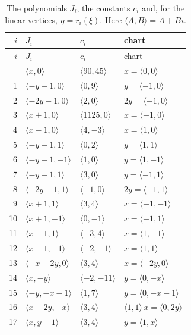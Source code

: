 \documentclass[11pt]{article}
\begin{document}
\begingroup\small
\setlength{\LTcapwidth}{\textwidth}
\begin{longtable}{@{}rlll@{}}
\caption{The polynomials $J_i$, the constants $c_i$ and, for the linear vertices, $\eta=r_i(\xi)$. Here $\langle A,B\rangle=A+Bi$.}\label{tab:cvert1}\\
\hline $i$ & $J_i$ & $c_i$ & chart\\\hline\endfirsthead\hline $i$ & $J_i$ & $c_i$ & chart\\\hline\endhead\hline\endfoot
0 & $\langle x,0\rangle$ & $\langle 90,45\rangle$ & $x=\langle 0,0\rangle$\\
1 & $\langle -y-1,0\rangle$ & $\langle 0,9\rangle$ & $y=\langle -1,0\rangle$\\
2 & $\langle -2y-1,0\rangle$ & $\langle 2,0\rangle$ & $2y=\langle -1,0\rangle$\\
3 & $\langle x+1,0\rangle$ & $\langle 1125,0\rangle$ & $x=\langle -1,0\rangle$\\
4 & $\langle x-1,0\rangle$ & $\langle 4,-3\rangle$ & $x=\langle 1,0\rangle$\\
5 & $\langle -y+1,1\rangle$ & $\langle 0,2\rangle$ & $y=\langle 1,1\rangle$\\
6 & $\langle -y+1,-1\rangle$ & $\langle 1,0\rangle$ & $y=\langle 1,-1\rangle$\\
7 & $\langle -y-1,1\rangle$ & $\langle 3,0\rangle$ & $y=\langle -1,1\rangle$\\
8 & $\langle -2y-1,1\rangle$ & $\langle -1,0\rangle$ & $2y=\langle -1,1\rangle$\\
9 & $\langle x+1,1\rangle$ & $\langle 3,4\rangle$ & $x=\langle -1,-1\rangle$\\
10 & $\langle x+1,-1\rangle$ & $\langle 0,-1\rangle$ & $x=\langle -1,1\rangle$\\
11 & $\langle x-1,1\rangle$ & $\langle -3,4\rangle$ & $x=\langle 1,-1\rangle$\\
12 & $\langle x-1,-1\rangle$ & $\langle -2,-1\rangle$ & $x=\langle 1,1\rangle$\\
13 & $\langle -x-2y,0\rangle$ & $\langle 3,4\rangle$ & $x=\langle -2y,0\rangle$\\
14 & $\langle x,-y\rangle$ & $\langle -2,-11\rangle$ & $y=\langle 0,-x\rangle$\\
15 & $\langle -y,-x-1\rangle$ & $\langle 1,7\rangle$ & $y=\langle 0,-x-1\rangle$\\
16 & $\langle x-2y,-x\rangle$ & $\langle 3,4\rangle$ & $\langle 1,1\rangle\,x=\langle 0,2y\rangle$\\
17 & $\langle x,y-1\rangle$ & $\langle 3,4\rangle$ & $y=\langle 1,x\rangle$\\

\end{longtable}
\end{document}
